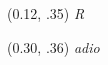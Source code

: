\documentclass[12pt]{article}
\begin{document}
\begin{textblock}{0}(0.12, .35)
	\oefamily\itshape\Huge R
\end{textblock}

\begin{textblock}{0}(0.30, .36)
	\oefamily\itshape\large adio
\end{textblock}

\end{document}
